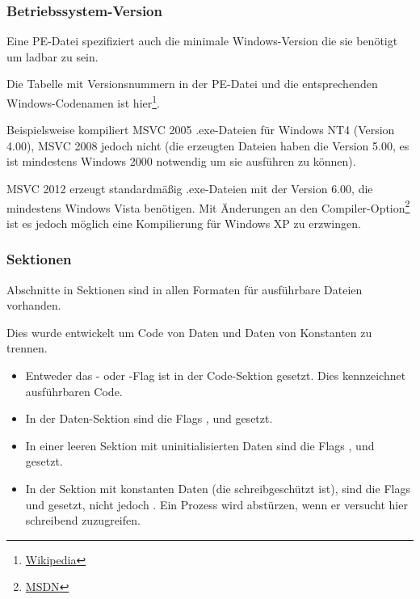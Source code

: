 \subsubsection{Betriebssystem-Version}

Eine PE-Datei spezifiziert auch die minimale Windows-Version die sie benötigt um
ladbar zu sein.

Die Tabelle mit Versionsnummern in der PE-Datei und die entsprechenden Windows-Codenamen
ist hier\footnote{\href{http://go.yurichev.com/17044}{Wikipedia}}.

Beispielsweise kompiliert \ac{MSVC} 2005 .exe-Dateien für Windows NT4 (Version 4.00),
\ac{MSVC} 2008 jedoch nicht (die erzeugten Dateien haben die Version 5.00, es ist
mindestens Windows 2000 notwendig um sie ausführen zu können).


\ac{MSVC} 2012 erzeugt standardmäßig .exe-Dateien mit der Version 6.00, die mindestens
Windows Vista benötigen.
Mit Änderungen an den Compiler-Option\footnote{\href{http://go.yurichev.com/17045}{MSDN}}
ist es jedoch möglich eine Kompilierung für Windows XP zu erzwingen.

\subsubsection{Sektionen}

Abschnitte in Sektionen sind in allen Formaten für ausführbare Dateien vorhanden.

Dies wurde entwickelt um Code von Daten und Daten von Konstanten zu trennen.

\begin{itemize}
\item Entweder das - oder -Flag
ist in der Code-Sektion gesetzt. Dies kennzeichnet ausführbaren Code.

\item In der Daten-Sektion sind die Flags ,
 und  gesetzt.

\item In einer leeren Sektion mit uninitialisierten Daten sind die Flags
,  und
 gesetzt.

\item In der Sektion mit konstanten Daten (die schreibgeschützt ist), sind die
Flags  und 
gesetzt, nicht jedoch .
Ein Prozess wird abstürzen, wenn er versucht hier schreibend zuzugreifen.

\end{itemize}

